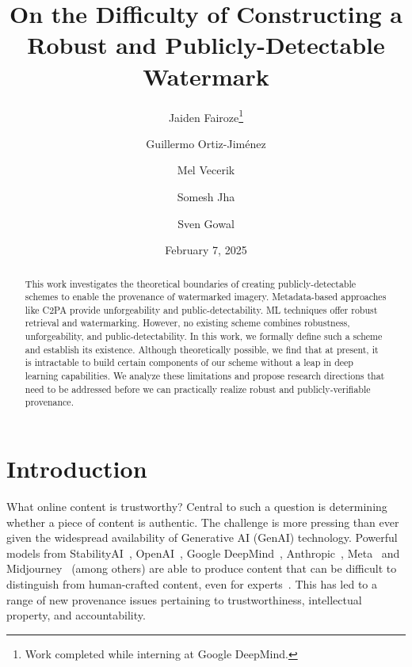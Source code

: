 \documentclass[12pt]{article}
\title{On the Difficulty of Constructing a Robust and Publicly-Detectable Watermark}
\author[1]{Jaiden Fairoze\thanks{Work completed while interning at Google DeepMind.}}
\author[2]{Guillermo Ortiz-Jiménez}
\author[2]{Mel Vecerik}
\author[3]{Somesh Jha}
\author[2]{Sven Gowal}
\affil[1]{University of California, Berkeley}
\affil[2]{Google DeepMind}
\affil[3]{University of Wisconsin–Madison}
\date{February 7, 2025}
\begin{document}
\maketitle

\begin{abstract}
    This work investigates the theoretical boundaries of creating publicly-detectable schemes to enable the provenance of watermarked imagery.
    Metadata-based approaches like C2PA provide unforgeability and public-detectability.
    ML techniques offer robust retrieval and watermarking.
    However, no existing scheme combines robustness, unforgeability, and public-detectability.
    In this work, we formally define such a scheme and establish its existence.
    Although theoretically possible, we find that at present, it is intractable to build certain components of our scheme without a leap in deep learning capabilities.
    We analyze these limitations and propose research directions that need to be addressed before we can practically realize robust and publicly-verifiable provenance.
\end{abstract}

\section{Introduction}

What online content is trustworthy?
Central to such a question is determining whether a piece of content is authentic.
The challenge is more pressing than ever given the widespread availability of Generative AI (GenAI) technology.
Powerful models from StabilityAI~\citep{rombach2022high}, OpenAI~\citep{achiam2023gpt}, Google DeepMind~\citep{reid2024gemini}, Anthropic~\citep{anthropic2024claude}, Meta~\citep{dubey2024llama} and Midjourney~\citep{midjourney} (among others) are able to produce content that can be difficult to distinguish from human-crafted content, even for experts~\citep{ha2024organic}.
This has led to a range of new provenance issues pertaining to trustworthiness, intellectual property, and accountability.

\end{document}
